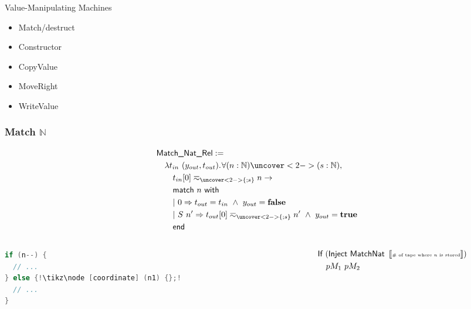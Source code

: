 \documentclass{beamer} %
\renewcommand{\Nat}{\mathbb{N}}
\begin{document}
\begin{frame}{Value-Manipulating Machines}
  \begin{itemize}
  \item Match/destruct
  \item Constructor
  \item CopyValue
  \item MoveRight
  \item WriteValue
  \end{itemize}
\end{frame}


\begin{frame}[fragile] \frametitle{Match $\Nat$}
  \footnotesize

  {\footnotesize
    \begin{align*}
      & \MS{Match\_Nat\_Rel} := \\
      & \quad \lam {t_{in}~(y_{out}, t_{out})} \forall (n:\Nat) \uncover<2->{(s:\Nat)}, \\
      & \quad\quad t_{in}[0] \eqsim_{\uncover<2->{\{;s\}}} n \rightarrow \\
      & \quad\quad \MS{match}~n~\MS{with} \\
      & \quad\quad |~0 \Rightarrow t_{out} = t_{in} ~\land~ y_{out} = \false \\
      & \quad\quad |~S~n' \Rightarrow t_{out}[0]  \eqsim_{\uncover<2->{\{;s\}}} n' ~\land~ y_{out} = \true \\
      & \quad\quad \MS{end}
    \end{align*}
  }

  \pause\pause
  \begin{columns}
    \begin{column}{0.5\textwidth}
      
\begin{lstlisting}[language=c, escapechar=!]
if (n--) {
  // ...
} else {!\tikz\node [coordinate] (n1) {};!
  // ...
}
\end{lstlisting}
    \end{column}
    \begin{column}{0.5\textwidth}
      \begin{align*}
        & \textsf{If}~(\textsf{Inject}~\textsf{MatchNat}~\left\llbracket  \text{\tiny \# of tape where $n$ is stored}  \right\rrbracket) \\
        & \quad pM_1~pM_2
      \end{align*}
    \end{column}
  \end{columns}

\end{frame}
\end{document}
